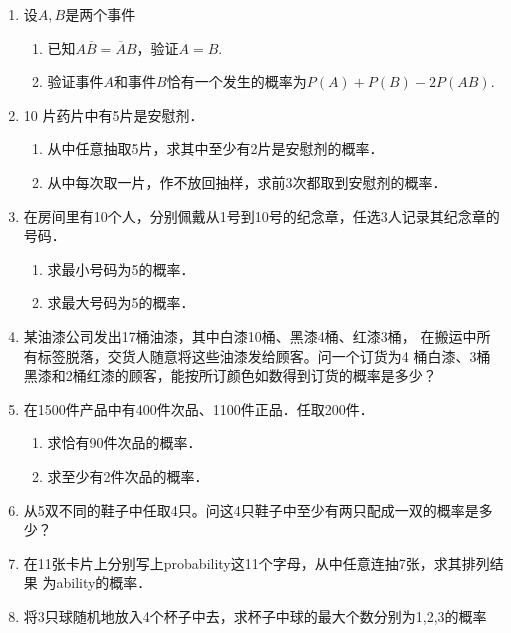 \begin{enumerate}
    \item 设$A,B$是两个事件
    \begin{enumerate}
        \item 已知$A\overline{B}=\overline{A}B$，验证$A=B$.
        \item 验证事件$A$和事件$B$恰有一个发生的概率为$P(A)+P(B)-2P(AB)$.
    \end{enumerate}



    \item 10 片药片中有5片是安慰剂．
    \begin{enumerate}
        \item 从中任意抽取5片，求其中至少有2片是安慰剂的概率．
        \item 从中每次取一片，作不放回抽样，求前3次都取到安慰剂的概率．
    \end{enumerate}



    \item 在房间里有10个人，分别佩戴从1号到10号的纪念章，任选3人记录其纪念章的号码．
    \begin{enumerate}
        \item 求最小号码为5的概率．
        \item 求最大号码为5的概率．
    \end{enumerate}



    \item 某油漆公司发出17桶油漆，其中白漆10桶、黑漆4桶、红漆3桶，
    在搬运中所有标签脱落，交货人随意将这些油漆发给顾客。问一个订货为4
    桶白漆、3桶黑漆和2桶红漆的顾客，能按所订颜色如数得到订货的概率是多少？

    
    \item 在1500件产品中有400件次品、1100件正品．任取200件．
    \begin{enumerate}
        \item 求恰有90件次品的概率．
        \item 求至少有2件次品的概率．
    \end{enumerate}



    \item 从5双不同的鞋子中任取4只。问这4只鞋子中至少有两只配成一双的概率是多少？


    \item 在11张卡片上分别写上probability这11个字母，从中任意连抽7张，求其排列结果
    为ability的概率．


    \item 将3只球随机地放入4个杯子中去，求杯子中球的最大个数分别为1,2,3的概率




\end{enumerate}
